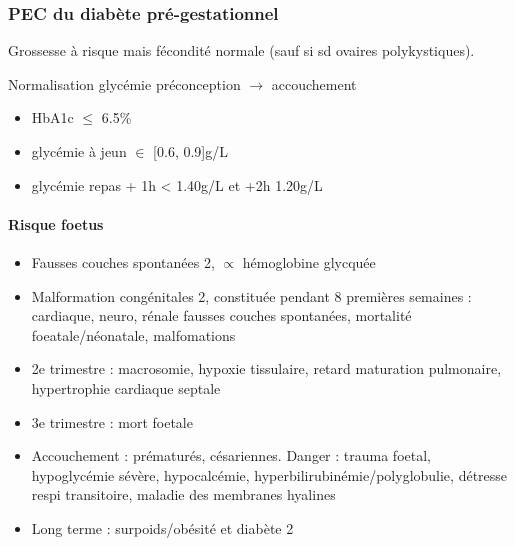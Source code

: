 \documentclass[11pt]{article}
\begin{document}
\subsubsection{PEC du diabète pré-gestationnel}
\label{sec:org74a7042}
Grossesse à risque mais fécondité normale (sauf si sd ovaires polykystiques).

\danger{} Normalisation glycémie préconception \(\rightarrow\) accouchement
\begin{itemize}
\item HbA1c \(\le\) 6.5\%
\item glycémie à jeun \(\in\) [0.6, 0.9]g/L
\item glycémie repas + 1h < 1.40g/L et +2h 1.20g/L
\end{itemize}

\paragraph{Risque foetus}
\label{sec:orga062e64}
\begin{itemize}
\item Fausses couches spontanées \texttimes{}2, \(\propto\) hémoglobine glycquée
\item Malformation congénitales \texttimes{}2, constituée pendant 8 premières semaines :
cardiaque, neuro, rénale \thus \inc fausses couches spontanées, mortalité
foeatale/néonatale, malfomations
\item 2e trimestre : macrosomie, hypoxie tissulaire, retard maturation pulmonaire,
hypertrophie cardiaque septale
\item 3e trimestre : mort foetale
\item Accouchement : \inc prématurés, césariennes. Danger : trauma foetal,
hypoglycémie sévère, hypocalcémie, hyperbilirubinémie/polyglobulie, détresse
respi transitoire, maladie des membranes hyalines
\item Long terme : surpoids/obésité et diabète 2
\end{itemize}
\end{document}
